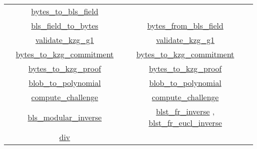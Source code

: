 \documentclass[12pt]{galois-whitepaper}
\begin{document}
\begin{center}
\begin{tabular}{ |c|c|c| }
            & \href{https://github.com/ethereum/c-kzg-4844/blob/main/src/common/bytes.c\#L64}{bytes\_to\_bls\_field}\\
            & \href{https://github.com/ethereum/consensus-specs/blob/dev/specs/deneb/polynomial-commitments.md\#bls_field_to_bytes}{bls\_field\_to\_bytes}
            & \href{https://github.com/ethereum/c-kzg-4844/blob/main/src/common/bytes.c\#L52}{bytes\_from\_bls\_field}\\
            & \href{https://github.com/ethereum/consensus-specs/blob/dev/specs/deneb/polynomial-commitments.md\#validate_kzg_g1}{validate\_kzg\_g1}
            & \href{https://github.com/ethereum/c-kzg-4844/blob/main/src/common/bytes.c\#L81}{validate\_kzg\_g1}\\
            & \href{https://github.com/ethereum/consensus-specs/blob/dev/specs/deneb/polynomial-commitments.md\#bytes_to_kzg_commitment}{bytes\_to\_kzg\_commitment}
            & \href{https://github.com/ethereum/c-kzg-4844/blob/main/src/common/bytes.c\#L103}{bytes\_to\_kzg\_commitment}\\
            & \href{https://github.com/ethereum/consensus-specs/blob/dev/specs/deneb/polynomial-commitments.md\#bytes_to_kzg_proof}{bytes\_to\_kzg\_proof}
            & \href{https://github.com/ethereum/c-kzg-4844/blob/main/src/common/bytes.c\#L113}{bytes\_to\_kzg\_proof}\\
            & \href{https://github.com/ethereum/consensus-specs/blob/dev/specs/deneb/polynomial-commitments.md\#blob_to_polynomial}{blob\_to\_polynomial}
            & \href{https://github.com/ethereum/c-kzg-4844/blob/main/src/eip4844/blob.c\#L29}{blob\_to\_polynomial}\\
            & \href{https://github.com/ethereum/consensus-specs/blob/dev/specs/deneb/polynomial-commitments.md\#compute_challenge}{compute\_challenge}
            & \href{https://github.com/ethereum/c-kzg-4844/blob/main/src/eip4844/eip4844.c\#L156}{compute\_challenge}\\
            & \href{https://github.com/ethereum/consensus-specs/blob/dev/specs/deneb/polynomial-commitments.md\#bls_modular_inverse}{bls\_modular\_inverse}
            & \href{https://github.com/ethereum/c-kzg-4844/blob/main/bindings/go/blst_headers/blst.h\#L100}{blst\_fr\_inverse}
            , \href{https://github.com/ethereum/c-kzg-4844/blob/main/bindings/go/blst_headers/blst.h\#L99}{blst\_fr\_eucl\_inverse}\\
            & \href{https://github.com/ethereum/consensus-specs/blob/dev/specs/deneb/polynomial-commitments.md\#div}{div}

\end{tabular}
\end{center}
\end{document}
